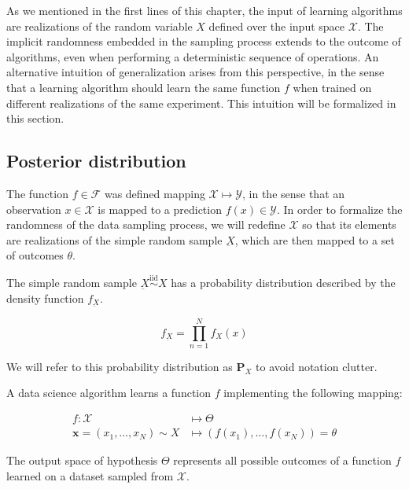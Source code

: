 As we mentioned in the first lines of this chapter, the input of learning algorithms are
realizations of the random variable $X$ defined over the input space $\mathcal{X}$. The
implicit randomness embedded in the sampling process extends to the outcome of algorithms,
even when performing a deterministic sequence of operations. An alternative intuition of 
generalization arises from this perspective, in the sense that a learning algorithm should
learn the same function $f$ when trained on different realizations of the same experiment. This
intuition will be formalized in this section.\\

\subsection{Posterior distribution}

The function $f \in \mathcal{F}$ was defined mapping $\mathcal{X} \longmapsto \mathcal{Y}$, in the sense that an observation $x \in \mathcal{X}$ is mapped to
a prediction $f(x) \in \mathcal{Y}$. In order to formalize the randomness of the data sampling process, we
will redefine $\mathcal{X}$ so that its elements are realizations of the simple 
random sample $\underbar{X}$, which are then mapped to a set of outcomes $\theta$.

\begin{definition}
    The simple random sample $\underbar{X} \overset{\text{iid}}{\sim} X$ has a probability distribution
    described by the density function $f_{\underbar{X}}$.

    $$
     f_{\underbar{X}} = \prod_{n=1}^{N} f_{X}(x)
    $$

    We will refer to this probability distribution as $\mathbf{P}_X$ to avoid notation clutter.
\end{definition}

\begin{definition}
    A data science algorithm learns a function $f$ implementing the following mapping:

    $$
    \begin{aligned}
        f: \mathcal{X} & \longmapsto \Theta \\
        \bm{x} = (x_1, \dots, x_N) \sim X  & \longmapsto (f(x_1), \dots, f(x_N)) = \theta
    \end{aligned}
    $$

    The output space of hypothesis $\Theta$ represents all possible outcomes of a function
    $f$ learned on a dataset sampled from $\mathcal{X}$.

\end{definition}

